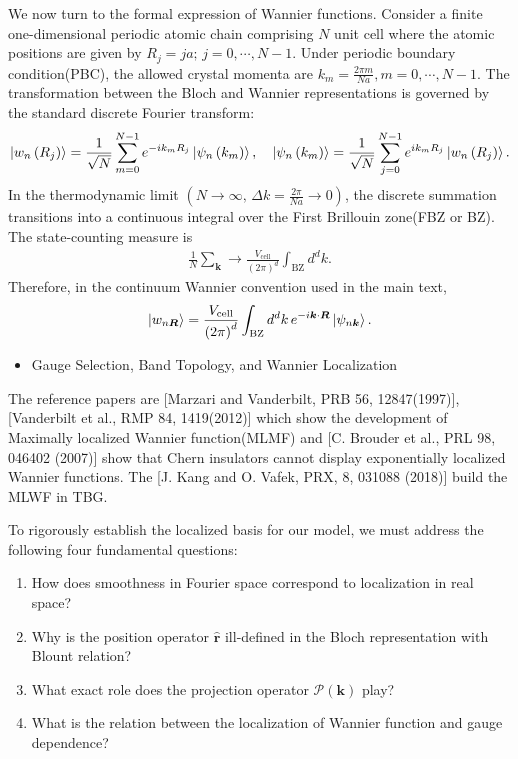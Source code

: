 \documentclass[12pt, oneside]{article}
\newcommand{\mr}[1]{\mathrm{#1}}
\newcommand{\p}[1]{\left(#1\right)}
\numberwithin{equation}{subsection}
\begin{document}
We now turn to the formal expression of Wannier functions. Consider a finite one-dimensional periodic atomic chain comprising \(N\) unit cell where the atomic positions are given by \(R_j = ja; \, j = 0 , \cdots ,N-1\). Under periodic boundary condition(PBC), the allowed crystal momenta are \(k_m = \frac{2 \pi m}{N a}, m = 0,\cdots,N-1\). The transformation between the Bloch and Wannier representations is governed by the standard discrete Fourier transform:
\begin{align}
	\begin{split}
		\ket{w_n \p{R_j}} = \frac{1}{\sqrt{N}} \sum^{N-1}_{m = 0} e^{-i k_{m} R_{j}} \ket{\psi_n \p{k_m}}, \quad \ket{\psi_n \p{k_m}} = \frac{1}{\sqrt{N}} \sum^{N-1}_{j = 0} e^{i k_{m} R_{j}}\ket{w_n \p{R_j}}.
	\end{split}
\end{align}
In the thermodynamic limit \(\p{N \rightarrow \infty,\, \Delta k = \frac{2 \pi}{N a} \rightarrow 0}\), the discrete summation transitions into a continuous integral over the First Brillouin zone(FBZ or BZ). The state-counting measure is
\begin{align}
	\frac{1}{N}\sum_{\bm{k}} \rightarrow \frac{V_{\mr{cell}}}{\p{2 \pi}^{d}} \int_{\mr{BZ}} d^{d} k.
\end{align}
Therefore, in the continuum Wannier convention used in the main text,
\begin{align}
	\ket{w_{n\bm R}}
	= \frac{V_{\mr{cell}}}{\p{2 \pi}^{d}}
	\int_{\mr{BZ}} d^d k\, e^{-i\bm{k}\cdot\bm R}
	\ket{\psi_{n\bm k}}.
\end{align}

\begin{itemize}
	\item Gauge Selection, Band Topology, and Wannier Localization
\end{itemize} 

The reference papers are [Marzari and Vanderbilt, PRB 56, 12847(1997)], [Vanderbilt et al., RMP 84, 1419(2012)] which show the development of Maximally localized Wannier function(MLMF) and [C. Brouder et al., PRL 98, 046402 (2007)] show that Chern insulators cannot display exponentially localized Wannier functions. The [J. Kang and O. Vafek, PRX, 8, 031088 (2018)] build the MLWF in TBG.	

To rigorously establish the localized basis for our model, we must address the following four fundamental questions:
\begin{enumerate}[label=(\roman*)]
    \item How does smoothness in Fourier space correspond to localization in real space?
    \item Why is the position operator \(\hat{\bm{r}}\) ill-defined  in the Bloch representation with Blount relation?
    \item What exact role does the projection operator \(\mathcal{P} \p{\bm{k}}\) play?
    \item What is the relation between the localization of Wannier function and gauge dependence? 
\end{enumerate}
\end{document}

